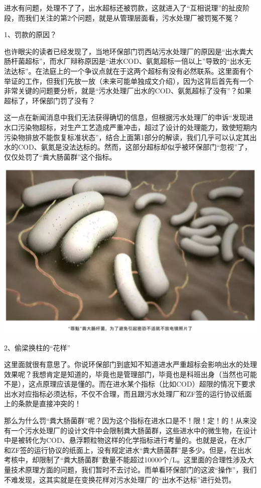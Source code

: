 \documentclass[]{book}
\begin{document}
进水有问题，处理不了了，出水超标还被罚款，这就进入了``互相说理''的扯皮阶段，而我们关注的第2个问题，就是从管理层面看，污水处理厂被罚冤不冤？

1、罚款的原因？

也许眼尖的读者已经发现了，当地环保部门罚西站污水处理厂的原因是``出水粪大肠杆菌超标''，而水厂辩称原因是``进水COD、氨氮超标一倍以上''导致的``出水无法达标''。在法庭上的一个争议点就在于这两个超标有没有必然联系。这里面有个举证的工作，但我们先放一放（未来可能单独成文介绍），因为这背后首先有一个非常关键的问题要分析，就是``污水处理厂出水的COD、氨氮超标了没有''？如果超标了，环保部门罚了没有？

这一点在新闻消息中我们无法获得确切的信息，但根据污水处理厂的申诉``发现进水口污染物超标，对生产工艺造成严重冲击，超过了设计的处理能力，致使短期内污染物排放不能恢复标准状态''，结合上面第1部分的解读，我们几乎可以认定其出水的COD、氨氮是没法达标的。然而，这部分超标却似乎被环保部门``忽视''了，仅仅处罚了``粪大肠菌群''这个指标。

\includegraphics[width=6.67in]{images/py2}

2、偷梁换柱的``花样''

这里面就很有意思了。你说环保部门到底知不知道进水严重超标会影响出水的处理效果呢？我想肯定是知道的，毕竟也是管理部门，毕竟也是科班出身（当然也可能不是），这点原理应该是懂的。而在进水某个指标（比如COD）超限的情况下要求出水对应指标必须达标，不仅不合理，而且跟污水处理厂和ZF签的运行协议纸面上的条款是直接冲突的！

那么为什么罚``粪大肠菌群''呢？因为这个指标在进水口是不！限！定！的！从来没有一个污水处理厂的设计文件中会限制粪大肠菌群，这些进水中的微生物，在设计中是被转化为COD、悬浮颗粒物这样的化学指标进行考量的。也就是说，在水厂和ZF签的运行协议的纸面上，没有规定进水``粪大肠菌群''是多少。但是，在出水考核中，却限制了``粪大肠菌群''数量不能超过10000个/L。这里面的合理性涉及大量技术原理方面的问题，我们暂时不去讨论。而单看环保部门的这波``操作''，我们不难发现，这其实就是在变换花样对污水处理厂的``出水不达标''进行处罚。
\end{document}
